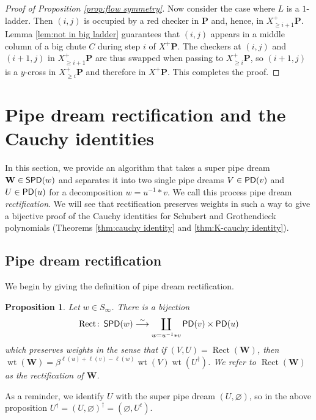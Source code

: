 \documentclass[11pt,reqno]{amsart} %
\newcommand{\bfP}{\mathbf{P}}
\newcommand{\bfW}{\mathbf{W}}
\DeclareMathOperator{\wt}{wt}
\DeclareMathOperator{\PD}{\sf{PD}}
\DeclareMathOperator{\SPD}{\sf{SPD}}
\DeclareMathOperator{\Rect}{Rect} %
\newtheorem{proposition}[theorem]{Proposition}
\theoremstyle{definition}
\begin{document}
\begin{proof}[Proof of Proposition \ref{prop:flow symmetry}]
Now consider the case where $L$ is a $1$-ladder.
Then $(i,j)$ is occupied by a red checker in $\bfP$ and, hence, in $X^+_{\geq i+1}\bfP$.
Lemma \ref{lem:not in big ladder} guarantees that $(i,j)$ appears in a middle column of a big chute $C$ during step $i$ of $X^+\bfP$.
The checkers at $(i,j)$ and $(i+1,j)$ in $X^+_{\geq i+1}\bfP$ are thus swapped when passing to $X^+_{\geq i}\bfP$, so $(i+1,j)$ is a $y$-cross in $X^+_{\geq i}\bfP$ and therefore in $X^+\bfP$.
This completes the proof.
\end{proof}


\section{Pipe dream rectification and the Cauchy identities}
\label{sect:cauchy rectification}

In this section, we provide an algorithm that takes a super pipe dream $\bfW\in \SPD(w)$ and separates it into two single pipe dreams $V\in \PD(v)$ and $U\in \PD(u)$ for a decomposition $w = u^{-1}*v$.
We call this process pipe dream \textit{rectification}.
We will see that rectification preserves weights in such a way to give a bijective proof of the Cauchy identities for Schubert and Grothendieck polynomials (Theorems \ref{thm:cauchy identity} and \ref{thm:K-cauchy identity}).



\subsection{Pipe dream rectification}
\label{subsect:rectification}

We begin by giving the definition of pipe dream rectification.

\begin{proposition}
\label{prop:rectification}
Let $w\in S_\infty$.
There is a bijection \[
    \Rect\colon \SPD(w)
    \overset\sim\longrightarrow
    \coprod_{
        w = u^{-1} * v
    } \PD(v) \times \PD(u)
\] which preserves weights in the sense that if $(V,U) = \Rect(\bfW)$, then $\wt(\bfW) = \beta^{\ell(u) + \ell(v) - \ell(w)}\wt(V)\wt(U^\dagger)$.
We refer to $\Rect(\bfW)$ as the \textit{rectification} of $\bfW$.
\end{proposition}
As a reminder, we identify $U$ with the super pipe dream $(U,\varnothing)$, so in the above proposition $U^\dagger = (U,\varnothing)^\dagger = (\varnothing,U^t)$.
\end{document}
